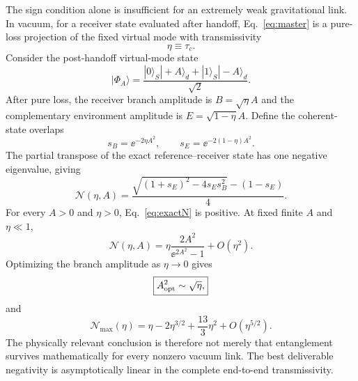 The sign condition alone is insufficient for an extremely weak gravitational link. In vacuum, for a receiver state evaluated after handoff, Eq.~\eqref{eq:master} is a pure-loss projection of the fixed virtual mode with transmissivity
\begin{equation}
\eta\equiv\tau_c.
\end{equation}
Consider the post-handoff virtual-mode state
\begin{equation}
|\Phi_A\rangle
=\frac{|0\rangle_S|+A\rangle_d+|1\rangle_S|-A\rangle_d}{\sqrt2}.
\label{eq:hybrid}
\end{equation}
After pure loss, the receiver branch amplitude is $B=\sqrt\eta A$ and the complementary environment amplitude is $E=\sqrt{1-\eta}A$. Define the coherent-state overlaps
\begin{equation}
s_B=\ee^{-2\eta A^2},
\qquad
s_E=\ee^{-2(1-\eta)A^2}.
\end{equation}
The partial transpose of the exact reference--receiver state has one negative eigenvalue, giving
\begin{equation}
\boxed{
\mathcal N(\eta,A)=
\frac{
\sqrt{(1+s_E)^2-4s_Es_B^2}
-(1-s_E)}{4}.}
\label{eq:exactN}
\end{equation}
For every $A>0$ and $\eta>0$, Eq.~\eqref{eq:exactN} is positive. At fixed finite $A$ and $\eta\ll1$,
\begin{equation}
\boxed{
\mathcal N(\eta,A)=
\eta\frac{2A^2}{\ee^{2A^2}-1}+O(\eta^2).}
\label{eq:fixedAweak}
\end{equation}
Optimizing the branch amplitude as $\eta\to0$ gives
\begin{equation}
\boxed{A_{\rm opt}^2\sim\sqrt\eta,}
\end{equation}
and
\begin{equation}
\boxed{
\mathcal N_{\max}(\eta)
=\eta-2\eta^{3/2}+\frac{13}{3}\eta^2+O(\eta^{5/2}).}
\label{eq:Nopt}
\end{equation}
The physically relevant conclusion is therefore not merely that entanglement survives mathematically for every nonzero vacuum link. The best deliverable negativity is asymptotically linear in the complete end-to-end transmissivity.

